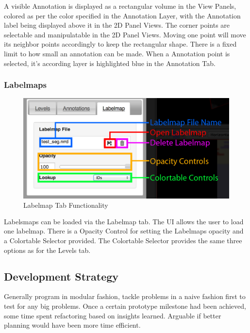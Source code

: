 \documentclass[a4paper,11pt,titlepage]{article}
\begin{document}
A visible Annotation is displayed as a rectangular volume in the View Panels, colored as per the color specified in the Annotation Layer, with the Annotation label being displayed above it in the 2D Panel Views. The corner points are selectable and manipulatable in the 2D Panel Views. Moving one point will move its neighbor points accordingly to keep the rectangular shape. There is a fixed limit to how small an annotation can be made. When a Annotation point is selected, it's according layer is highlighted blue in the Annotation Tab.




\subsubsection{Labelmaps}

\begin{figure}[ht!]
\centering
\includegraphics[width=140mm]{graphics/features_06.png}
\caption{Labelmap Tab Functionality}
\label{fig:UIdesign1}
\end{figure}

Labelsmaps can be loaded via the Labelmap tab. The UI allows the user to load one labelmap. There is a Opacity Control for setting the Labelmaps opacity and a Colortable Selector provided. The Colortable Selector provides the same three options as for the Levels tab.




\subsection{Development Strategy}

Generally program in modular fashion, tackle problems in a naive fashion first to test for any big problems. Once a certain prototype milestone had been achieved, some time spent refactoring based on insights learned. Arguable if  better planning would have been more time efficient.
\end{document}
